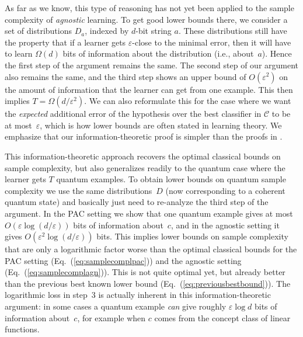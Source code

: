 \documentclass[twoside,11pt]{article}
\newcommand{\eps}{\varepsilon}
\newcommand{\C}{\ensuremath{\mathscr{C}}}
\begin{document}
As far as we know, this type of reasoning has not yet been applied to 
the sample complexity of \emph{agnostic} learning. To get good lower bounds there, we consider a set of distributions $D_a$, indexed by $d$-bit string $a$. These distributions still have the property that if a learner gets $\eps$-close to the minimal error, then it will have to learn $\Omega(d)$ bits of information about the distribution (i.e., about~$a$). Hence the first step of the argument remains the same.  The second step of our argument also remains the same, and the third step shows an upper bound of $O(\eps^2)$ on the amount of information that the learner can get from one example.  This then implies $T=\Omega(d/\eps^2)$. We can also reformulate this for the case where we want the \emph{expected} additional error of the hypothesis over the best classifier in $\C$ to be at most~$\eps$, which is how lower bounds are often stated in learning theory.
We emphasize that our information-theoretic proof is simpler than the proofs in \cite{anthony&bartlett:learningbook,audibert:agnosticconstant1,shwartz&david:learningbook,aryeh:exactconstantagnostic}.

This information-theoretic approach recovers the optimal classical bounds on sample complexity, but also generalizes readily to the quantum case where the learner gets $T$ quantum examples. To obtain lower bounds on quantum sample complexity we use the same distributions~$D$ (now corresponding to a coherent quantum state) and basically just need to re-analyze the third step of the argument. In the PAC setting we show that one quantum example gives at most $O(\eps\log(d/\eps))$ bits of information about~$c$, and in the agnostic setting it gives $O(\eps^2\log(d/\eps))$ bits.
This implies lower bounds on sample complexity that are only a logarithmic factor worse than the optimal classical bounds for the PAC setting (Eq.~(\ref{eq:samplecomplpac})) and the agnostic setting (Eq.~(\ref{eq:samplecomplagn})).
This is not quite optimal yet, but already better than the previous best known lower bound (Eq.~(\ref{eq:previousbestbound})). 
The logarithmic loss in step~3 is actually inherent in this information-theoretic argument: in some cases a quantum example \emph{can} give roughly $\eps\log d$ bits of information about~$c$, for example when $c$ comes from the concept class of linear functions.
\end{document}
